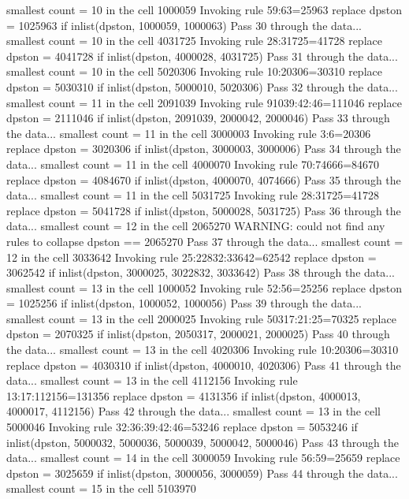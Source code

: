   smallest count = 10 in the cell      1000059
  Invoking rule 59:63=25963
  replace dpston = 1025963 if inlist(dpston, 1000059, 1000063)
Pass 30 through the data...
  smallest count = 10 in the cell      4031725
  Invoking rule 28:31725=41728
  replace dpston = 4041728 if inlist(dpston, 4000028, 4031725)
Pass 31 through the data...
  smallest count = 10 in the cell      5020306
  Invoking rule 10:20306=30310
  replace dpston = 5030310 if inlist(dpston, 5000010, 5020306)
Pass 32 through the data...
  smallest count = 11 in the cell      2091039
  Invoking rule 91039:42:46=111046
  replace dpston = 2111046 if inlist(dpston, 2091039, 2000042, 2000046)
Pass 33 through the data...
  smallest count = 11 in the cell      3000003
  Invoking rule 3:6=20306
  replace dpston = 3020306 if inlist(dpston, 3000003, 3000006)
Pass 34 through the data...
  smallest count = 11 in the cell      4000070
  Invoking rule 70:74666=84670
  replace dpston = 4084670 if inlist(dpston, 4000070, 4074666)
Pass 35 through the data...
  smallest count = 11 in the cell      5031725
  Invoking rule 28:31725=41728
  replace dpston = 5041728 if inlist(dpston, 5000028, 5031725)
Pass 36 through the data...
  smallest count = 12 in the cell      2065270
  WARNING: could not find any rules to collapse dpston == 2065270
Pass 37 through the data...
  smallest count = 12 in the cell      3033642
  Invoking rule 25:22832:33642=62542
  replace dpston = 3062542 if inlist(dpston, 3000025, 3022832, 3033642)
Pass 38 through the data...
  smallest count = 13 in the cell      1000052
  Invoking rule 52:56=25256
  replace dpston = 1025256 if inlist(dpston, 1000052, 1000056)
Pass 39 through the data...
  smallest count = 13 in the cell      2000025
  Invoking rule 50317:21:25=70325
  replace dpston = 2070325 if inlist(dpston, 2050317, 2000021, 2000025)
Pass 40 through the data...
  smallest count = 13 in the cell      4020306
  Invoking rule 10:20306=30310
  replace dpston = 4030310 if inlist(dpston, 4000010, 4020306)
Pass 41 through the data...
  smallest count = 13 in the cell      4112156
  Invoking rule 13:17:112156=131356
  replace dpston = 4131356 if inlist(dpston, 4000013, 4000017, 4112156)
Pass 42 through the data...
  smallest count = 13 in the cell      5000046
  Invoking rule 32:36:39:42:46=53246
  replace dpston = 5053246 if inlist(dpston, 5000032, 5000036, 5000039, 5000042, 5000046)
Pass 43 through the data...
  smallest count = 14 in the cell      3000059
  Invoking rule 56:59=25659
  replace dpston = 3025659 if inlist(dpston, 3000056, 3000059)
Pass 44 through the data...
  smallest count = 15 in the cell      5103970

